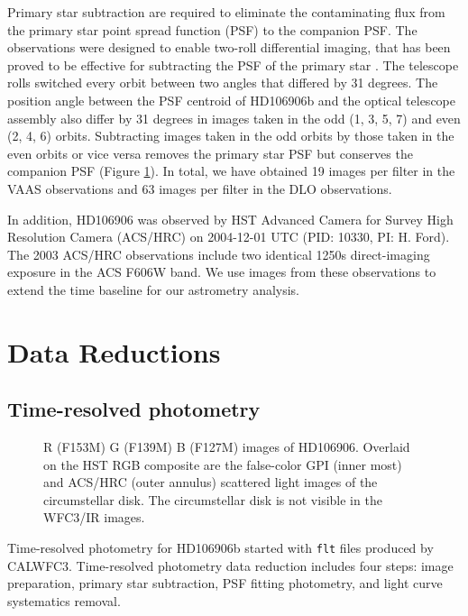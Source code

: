 \documentclass[twocolumn]{aastex62}
\begin{document}
Primary star subtraction are required to eliminate the contaminating flux from the primary star point spread function (PSF) to the companion PSF. The observations were designed to enable two-roll differential imaging, that has been proved to be effective for subtracting the PSF of the primary star \citep{Zhou2016,Zhou2019}. The telescope rolls switched every orbit between two angles that differed by 31 degrees. The position angle between the PSF centroid of HD106906b and the optical telescope assembly also differ by 31 degrees in images taken in the odd (1, 3, 5, 7) and even (2, 4, 6) orbits. Subtracting images taken in the odd orbits by those taken in the even orbits or vice versa removes the primary star PSF but conserves the companion PSF (Figure \ref{fig:2rdi}). In total, we have obtained 19 images per filter in the VAAS observations and 63 images per filter in the DLO observations. 

In addition, HD106906 was observed by HST Advanced Camera for Survey High Resolution Camera (ACS/HRC) on 2004-12-01 UTC (PID: 10330, PI: H. Ford). The 2003 ACS/HRC observations include two identical 1250s direct-imaging exposure in the ACS F606W band. We use images from these observations to extend the time baseline for our astrometry analysis.

\section{Data Reductions}

\subsection{Time-resolved photometry}
\begin{figure}
  \centering
  \caption{R (F153M) G (F139M) B (F127M) images of HD106906. Overlaid on the HST RGB composite are the false-color GPI (inner most) and ACS/HRC (outer annulus) scattered light images \citep{Kalas2015} of the circumstellar disk. The circumstellar disk is not visible in the WFC3/IR images.}
  \label{fig:2rdi}
\end{figure}

Time-resolved photometry for HD106906b started with \texttt{flt} files produced by CALWFC3. Time-resolved photometry data reduction includes four steps: image preparation, primary star subtraction, PSF fitting photometry, and light curve systematics removal.
\end{document}
